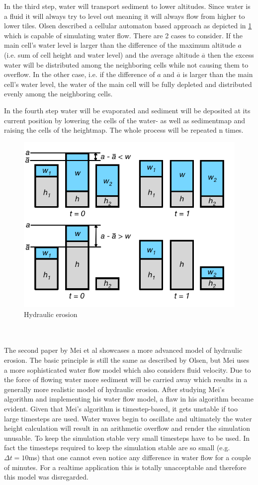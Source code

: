 \documentclass[11pt,a4paper,twoside,openright]{report}
\begin{document}
In the third step, water will transport sediment to lower altitudes. Since water is a fluid it will always try to level out meaning it will always flow from higher to lower tiles. Olsen described a cellular automaton based approach as depicted in \cref{fig:hydrolicerosion} which is capable of simulating water flow. There are 2 cases to consider. If the main cell's water level is larger than the difference of the maximum altitude $a$ (i.e. sum of cell height and water level) and the average altitude $\overline{a}$ then the excess water will be distributed among the neighboring cells while not causing them to overflow. In the other case, i.e. if the difference of $a$ and $\overline{a}$ is larger than the main cell's water level, the water of the main cell will be fully depleted and distributed evenly among the neighboring cells.

In the fourth step water will be evaporated and sediment will be deposited at its current position by lowering the cells of the water- as well as sedimentmap and raising the cells of the heightmap. The whole process will be repeated n times.
\begin{figure}[h]
\centering
\includegraphics[width=0.65\linewidth]{hydraulicerosion.png}
\caption{Hydraulic erosion}\label{fig:hydrolicerosion}
\end{figure}
\\
\\
The second paper \cite{mei:inria-00402079} by Mei et al showcases a more advanced model of hydraulic erosion. The basic principle is still the same as described by Olsen, but Mei uses a more sophisticated water flow model which also considers fluid velocity. Due to the force of flowing water more sediment will be carried away which results in a generally more realistic model of hydraulic erosion. After studying Mei's algorithm and implementing his water flow model, a flaw in his algorithm became evident. Given that Mei's algorithm is timestep-based, it gets unstable if too large timesteps are used. Water waves begin to oscillate and ultimately the water height calculation will result in an arithmetic overflow and render the simulation unusable. To keep the simulation stable very small timesteps have to be used. In fact the timesteps required to keep the simulation stable are so small (e.g. $\Delta t = 10$ms) that one cannot even notice any difference in water flow for a couple of minutes. For a realtime application this is totally unacceptable and therefore this model was disregarded.
\end{document}
